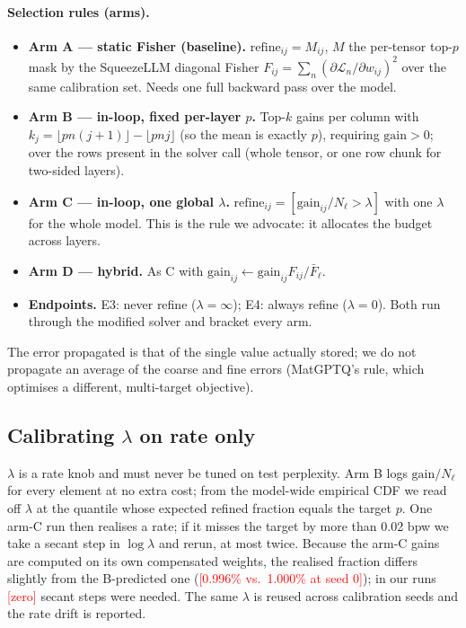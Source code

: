 \documentclass{article}
\newcommand{\tbd}[1]{\textcolor{red}{[#1]}}
\newcommand{\gain}{\mathrm{gain}}
\begin{document}
\paragraph{Selection rules (arms).}
\begin{itemize}\itemsep 0pt
\item \textbf{Arm A --- static Fisher (baseline).} $\mathrm{refine}_{ij}
  = M_{ij}$, $M$ the per-tensor top-$p$ mask by the SqueezeLLM diagonal
  Fisher $F_{ij} = \sum_n (\partial\mathcal{L}_n/\partial w_{ij})^2$ over
  the same calibration set. Needs one full backward pass over the model.
\item \textbf{Arm B --- in-loop, fixed per-layer $p$.} Top-$k$ gains per
  column with $k_j = \lfloor pn(j{+}1)\rfloor - \lfloor pnj\rfloor$ (so
  the mean is exactly $p$), requiring $\gain > 0$; over the rows present
  in the solver call (whole tensor, or one row chunk for two-sided
  layers).
\item \textbf{Arm C --- in-loop, one global $\lambda$.}
  $\mathrm{refine}_{ij} = [\gain_{ij}/N_\ell > \lambda]$ with one
  $\lambda$ for the whole model. This is the rule we advocate: it
  allocates the budget across layers.
\item \textbf{Arm D --- hybrid.} As C with $\gain_{ij} \leftarrow
  \gain_{ij} F_{ij}/\bar F_\ell$.
\item \textbf{Endpoints.} E3: never refine ($\lambda = \infty$); E4:
  always refine ($\lambda = 0$). Both run through the modified solver
  and bracket every arm.
\end{itemize}
The error propagated is that of the single value actually stored; we do
not propagate an average of the coarse and fine errors (MatGPTQ's rule,
which optimises a different, multi-target objective).

\subsection{Calibrating $\lambda$ on rate only}
\label{sec:lambda}

$\lambda$ is a rate knob and must never be tuned on test perplexity. Arm
B logs $\gain/N_\ell$ for every element at no extra cost; from the
model-wide empirical CDF we read off $\lambda$ at the quantile whose
expected refined fraction equals the target $p$. One arm-C run then
realises a rate; if it misses the target by more than 0.02 bpw we take a
secant step in $\log\lambda$ and rerun, at most twice. Because the arm-C
gains are computed on its own compensated weights, the realised fraction
differs slightly from the B-predicted one (\tbd{0.996\% vs.\ 1.000\% at
seed 0}); in our runs \tbd{zero} secant steps were needed. The same
$\lambda$ is reused across calibration seeds and the rate drift is
reported.
\end{document}
